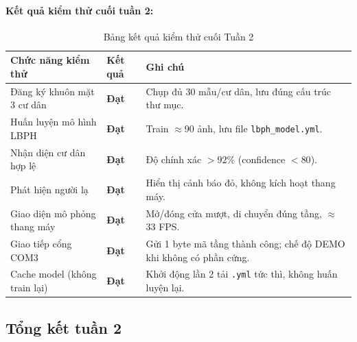 \documentclass[12pt,a4paper]{article}
\begin{document}
\paragraph{Kết quả kiểm thử cuối tuần 2:}
\begin{table}[H]
    \centering
    \renewcommand{\arraystretch}{1.4}
    \begin{tabular}{|p{5cm}|p{3cm}|p{6.5cm}|}
        \hline
        \rowcolor{lightblue}
        \textbf{Chức năng kiểm thử} & \textbf{Kết quả} & \textbf{Ghi chú} \\
        \hline
        Đăng ký khuôn mặt 3 cư dân & \textcolor{green!60!black}{\bfseries Đạt} & Chụp đủ 30 mẫu/cư dân, lưu đúng cấu trúc thư mục. \\
        \hline
        Huấn luyện mô hình LBPH & \textcolor{green!60!black}{\bfseries Đạt} & Train $\approx$90 ảnh, lưu file \texttt{lbph\_model.yml}. \\
        \hline
        Nhận diện cư dân hợp lệ & \textcolor{green!60!black}{\bfseries Đạt} & Độ chính xác $>92\%$ (confidence $< 80$). \\
        \hline
        Phát hiện người lạ & \textcolor{green!60!black}{\bfseries Đạt} & Hiển thị cảnh báo đỏ, không kích hoạt thang máy. \\
        \hline
        Giao diện mô phỏng thang máy & \textcolor{green!60!black}{\bfseries Đạt} & Mở/đóng cửa mượt, di chuyển đúng tầng, $\approx$33 FPS. \\
        \hline
        Giao tiếp cổng COM3 & \textcolor{green!60!black}{\bfseries Đạt} & Gửi 1 byte mã tầng thành công; chế độ DEMO khi không có phần cứng. \\
        \hline
        Cache model (không train lại) & \textcolor{green!60!black}{\bfseries Đạt} & Khởi động lần 2 tải \texttt{.yml} tức thì, không huấn luyện lại. \\
        \hline
    \end{tabular}
    \caption{Bảng kết quả kiểm thử cuối Tuần 2}
\end{table}

\subsection{Tổng kết tuần 2}
\end{document}
